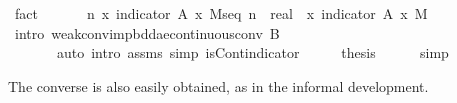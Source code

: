 \documentclass{article}
\theoremstyle{definition}
\begin{document}
\begin{isabellebody}
\ fact\isanewline
\ \ \isanewline
\ \ \isamarkupfalse%
\ {\isachardoublequoteopen}{\isacharparenleft}{\isasymlambda}n{\isachardot}\ {\isacharparenleft}{\isasymintegral}x{\isachardot}\ indicator\ A\ x\ {\isasympartial}M{\isacharunderscore}seq\ n{\isacharparenright}\ {\isacharcolon}{\isacharcolon}\ real{\isacharparenright}\ {\isacharminus}{\isacharminus}{\isacharminus}{\isacharminus}{\isachargreater}\ {\isacharparenleft}{\isasymintegral}x{\isachardot}\ indicator\ A\ x\ {\isasympartial}M{\isacharparenright}{\isachardoublequoteclose}\isanewline
\ \ \ \ \isamarkupfalse%
\ {\isacharparenleft}intro\ weak{\isacharunderscore}conv{\isacharunderscore}imp{\isacharunderscore}bdd{\isacharunderscore}ae{\isacharunderscore}continuous{\isacharunderscore}conv{\isacharbrackleft}\ B{\isacharequal}{}{\isacharbrackright}{\isacharparenright}\isanewline
\ \ \ \ \ \ \ {\isacharparenleft}auto\ intro{\isacharcolon}\ assms\ simp{\isacharcolon}\ isCont{\isacharunderscore}indicator{\isacharparenright}\isanewline
\ \ \isamarkupfalse%
\ \isamarkupfalse%
\ {\isacharquery}thesis\isanewline
\ \ \ \ \isamarkupfalse%
\ simp\isanewline
{}\isamarkupfalse%
\end{isabellebody}

\medskip

The converse is also easily obtained, as in the informal development.

\medskip
\end{document}
